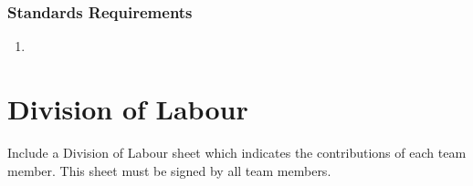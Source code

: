 \documentclass[titlepage]{article}
\begin{document}
		\subsubsection{Standards Requirements}
		\label{ssub:standards_requirements}
		\begin{enumerate}[{LR}1. ]
			\item 
		\end{enumerate}
		
		
		
		\clearpage{}
		\appendix
		\section{Division of Labour}
		\label{sec:division_of_labour}
		Include a Division of Labour sheet which indicates the contributions of each team member. This sheet must be signed by all team members.
		
		
		\iffalse
		\newpage
		\section*{IMPORTANT NOTES}
		\begin{itemize}
			\item Be sure to include all sections of the template in your document regardless whether you have something to write for each or not
			\begin{itemize}
				\item If you do not have anything to write in a section, indicate this by the \emph{N/A}, \emph{void}, \emph{none}, etc.
			\end{itemize}
			\item Uniquely number each of your requirements for easy identification and cross-referencing
			\item Highlight terms that are defined in Section~1.3 (\textbf{Definitions, Acronyms, and Abbreviations}) with \textbf{bold}, \emph{italic} or \underline{underline}
			\item For Deliverable 1, please highlight, in some fashion, all (you may have more than one) creative and innovative features. Your creative and innovative features will generally be described in Section~2.2 (\textbf{Product Functions}), but it will depend on the type of creative or innovative features you are including.
		\end{itemize}
		\fi
		
	
\end{document}

